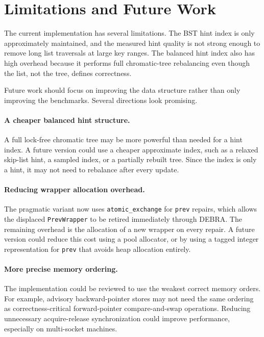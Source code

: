 \documentclass[a4paper,11pt]{article}
\newcommand{\code}[1]{\texttt{#1}}
\begin{document}
\section{Limitations and Future Work}

The current implementation has several limitations. The BST hint index is only approximately maintained, and the measured hint quality is not strong enough to remove long list traversals at large key ranges. The balanced hint index also has high overhead because it performs full chromatic-tree rebalancing even though the list, not the tree, defines correctness.

Future work should focus on improving the data structure rather than only improving the benchmarks. Several directions look promising.

\paragraph{A cheaper balanced hint structure.}
A full lock-free chromatic tree may be more powerful than needed for a hint index. A future version could use a cheaper approximate index, such as a relaxed skip-list hint, a sampled index, or a partially rebuilt tree. Since the index is only a hint, it may not need to rebalance after every update.

\paragraph{Reducing wrapper allocation overhead.}
The pragmatic variant now uses \code{atomic\_exchange} for \code{prev} repairs, which allows the displaced \code{PrevWrapper} to be retired immediately through DEBRA. The remaining overhead is the allocation of a new wrapper on every repair. A future version could reduce this cost using a pool allocator, or by using a tagged integer representation for \code{prev} that avoids heap allocation entirely.

\paragraph{More precise memory ordering.}
The implementation could be reviewed to use the weakest correct memory orders. For example, advisory backward-pointer stores may not need the same ordering as correctness-critical forward-pointer compare-and-swap operations. Reducing unnecessary acquire-release synchronization could improve performance, especially on multi-socket machines.
\end{document}
